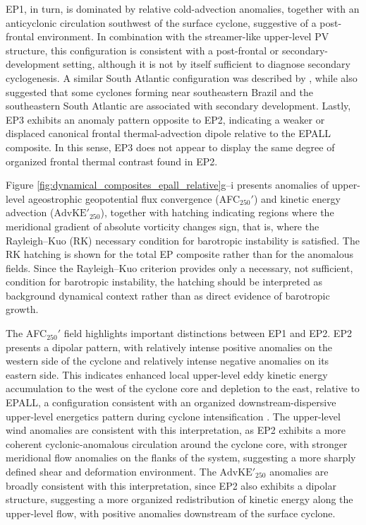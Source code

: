\documentclass[pdflatex,sn-chicago]{sn-jnl}%
\theoremstyle{plain}
\theoremstyle{definition}
\theoremstyle{remark}
\theoremstyle{definition}
\begin{document}
EP1, in turn, is dominated by relative cold-advection anomalies, together with an anticyclonic circulation southwest of the surface cyclone, suggestive of a post-frontal environment. In combination with the streamer-like upper-level PV structure, this configuration is consistent with a post-frontal or secondary-development setting, although it is not by itself sufficient to diagnose secondary cyclogenesis. A similar South Atlantic configuration was described by \citet{iwabe2009event}, while \citet{gramcianinov2019properties} also suggested that some cyclones forming near southeastern Brazil and the southeastern South Atlantic are associated with secondary development. Lastly, EP3 exhibits an anomaly pattern opposite to EP2, indicating a weaker or displaced canonical frontal thermal-advection dipole relative to the EPALL composite. In this sense, EP3 does not appear to display the same degree of organized frontal thermal contrast found in EP2.

Figure \ref{fig:dynamical_composites_epall_relative}g--i presents anomalies of upper-level ageostrophic geopotential flux convergence (AFC$_{250}'$) and kinetic energy advection ($\mathrm{AdvKE'}_{250}$), together with hatching indicating regions where the meridional gradient of absolute vorticity changes sign, that is, where the Rayleigh--Kuo (RK) necessary condition for barotropic instability is satisfied. The RK hatching is shown for the total EP composite rather than for the anomalous fields. Since the Rayleigh--Kuo criterion provides only a necessary, not sufficient, condition for barotropic instability, the hatching should be interpreted as background dynamical context rather than as direct evidence of barotropic growth.

The AFC$_{250}'$ field highlights important distinctions between EP1 and EP2. EP2 presents a dipolar pattern, with relatively intense positive anomalies on the western side of the cyclone and relatively intense negative anomalies on its eastern side. This indicates enhanced local upper-level eddy kinetic energy accumulation to the west of the cyclone core and depletion to the east, relative to EPALL, a configuration consistent with an organized downstream-dispersive upper-level energetics pattern during cyclone intensification \citep{orlanski1993ageostrophic,orlanski1995stages,piva2010energetics,pinheiro2022contributions}. The upper-level wind anomalies are consistent with this interpretation, as EP2 exhibits a more coherent cyclonic-anomalous circulation around the cyclone core, with stronger meridional flow anomalies on the flanks of the system, suggesting a more sharply defined shear and deformation environment. The $\mathrm{AdvKE'}_{250}$ anomalies are broadly consistent with this interpretation, since EP2 also exhibits a dipolar structure, suggesting a more organized redistribution of kinetic energy along the upper-level flow, with positive anomalies downstream of the surface cyclone.
\end{document}
